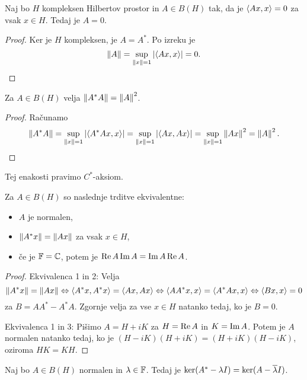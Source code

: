 \begin{trditev}
  Naj bo $H$ kompleksen Hilbertov prostor in $A \in B(H)$ tak, da je $\left< Ax,x \right>
  = 0$ za vsak $x \in H$.
  Tedaj je $A = 0$.
\end{trditev}

\begin{proof}
  Ker je $H$ kompleksen, je $A = A^*$.
  Po izreku je
  \[
	\left\lVert A\right\rVert = \sup_{\left\lVert x\right\rVert = 1} \left| \left< Ax,x \right> \right| = 0.
	\qedhere
  \]
\end{proof}

\begin{izrek}
  Za $A \in B(H)$ velja $\left\lVert A^* A\right\rVert = \left\lVert A\right\rVert^2$.
\end{izrek}

\begin{proof}
  Računamo
  \[
	\left\lVert A^* A\right\rVert
	= \sup_{\left\lVert x\right\rVert = 1} \left| \left< A^* Ax, x \right> \right|
	= \sup_{\left\lVert x\right\rVert = 1} \left| \left< Ax, Ax \right> \right|
	= \sup_{\left\lVert x\right\rVert = 1} \left\lVert Ax\right\rVert^2
	= \left\lVert A\right\rVert^2.
	\qedhere
  \]
\end{proof}

\begin{opomba}
  Tej enakosti pravimo $C^*$-aksiom.
\end{opomba}

\begin{trditev}
  Za $A \in B(H)$ so naslednje trditve ekvivalentne:
  \begin{itemize}
  \item $A$ je normalen,
  \item $\left\lVert A^* x\right\rVert = \left\lVert Ax\right\rVert$ za vsak $x \in H$,
  \item če je $\mathbb{F} = \mathbb{C}$, potem je $\operatorname{Re} A \operatorname{Im} A = \operatorname{Im} A \operatorname{Re} A$.
  \end{itemize}
\end{trditev}

\begin{proof}
  Ekvivalenca 1 in 2:
  Velja
  \[
	\left\lVert A^* x\right\rVert = \left\lVert A x\right\rVert
	\Leftrightarrow \left< A^*x, A^* x \right> = \left< Ax, Ax \right>
	\Leftrightarrow \left< A A^* x, x \right> = \left< A^* A x, x \right>
	\Leftrightarrow \left< B x, x \right> = 0
  \]
  za $B = A A^* - A^* A$.
  Zgornje velja za vse $x \in H$ natanko tedaj, ko je $B = 0$.

  Ekvivalenca 1 in 3:
  Pišimo $A = H + iK$ za $H = \operatorname{Re} A$ in $K = \operatorname{Im} A$.
  Potem je $A$ normalen natanko tedaj, ko je $(H - i K)(H + iK) = (H + iK)(H -
  iK)$, oziroma $HK = KH$.
\end{proof}

\begin{posledica}
  Naj bo $A \in B(H)$ normalen in $\lambda \in \mathbb{F}$.
  Tedaj je $\operatorname{ker} (A^* - \lambda I) = \operatorname{ker} (A - \overline{\lambda} I)$.
\end{posledica}

